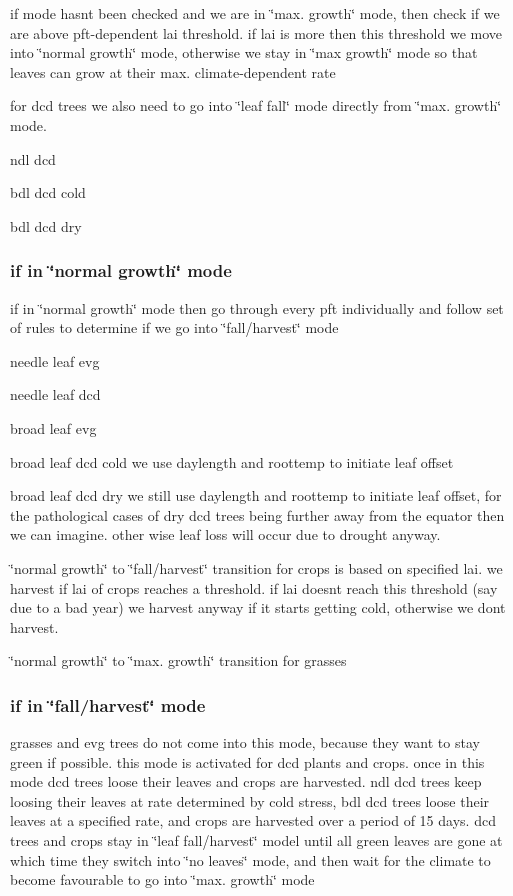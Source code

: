 if mode hasn\textquotesingle{}t been checked and we are in \char`\"{}max. growth\char`\"{} mode, then check if we are above pft-\/dependent lai threshold. if lai is more then this threshold we move into \char`\"{}normal growth\char`\"{} mode, otherwise we stay in \char`\"{}max growth\char`\"{} mode so that leaves can grow at their max. climate-\/dependent rate

for dcd trees we also need to go into \char`\"{}leaf fall\char`\"{} mode directly from \char`\"{}max. growth\char`\"{} mode.

ndl dcd

bdl dcd cold

bdl dcd dry

\subsubsection*{if in \char`\"{}normal growth\char`\"{} mode }

if in \char`\"{}normal growth\char`\"{} mode then go through every pft individually and follow set of rules to determine if we go into \char`\"{}fall/harvest\char`\"{} mode

needle leaf evg

needle leaf dcd

broad leaf evg

broad leaf dcd cold we use daylength and roottemp to initiate leaf offset

broad leaf dcd dry we still use daylength and roottemp to initiate leaf offset, for the pathological cases of dry dcd trees being further away from the equator then we can imagine. other wise leaf loss will occur due to drought anyway.

\char`\"{}normal growth\char`\"{} to \char`\"{}fall/harvest\char`\"{} transition for crops is based on specified lai. we harvest if lai of crops reaches a threshold. if lai doesn\textquotesingle{}t reach this threshold (say due to a bad year) we harvest anyway if it starts getting cold, otherwise we don\textquotesingle{}t harvest.

\char`\"{}normal growth\char`\"{} to \char`\"{}max. growth\char`\"{} transition for grasses

\subsubsection*{if in \char`\"{}fall/harvest\char`\"{} mode }

grasses and evg trees do not come into this mode, because they want to stay green if possible. this mode is activated for dcd plants and crops. once in this mode dcd trees loose their leaves and crops are harvested. ndl dcd trees keep loosing their leaves at rate determined by cold stress, bdl dcd trees loose their leaves at a specified rate, and crops are harvested over a period of 15 days. dcd trees and crops stay in \char`\"{}leaf fall/harvest\char`\"{} model until all green leaves are gone at which time they switch into \char`\"{}no leaves\char`\"{} mode, and then wait for the climate to become favourable to go into \char`\"{}max. growth\char`\"{} mode

